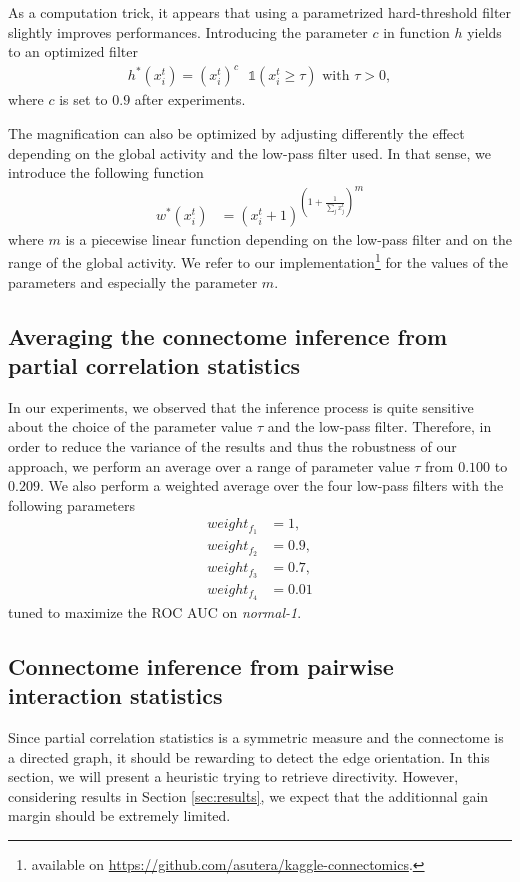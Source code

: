 \documentclass[wcp]{jmlr}
\begin{document}
As a computation trick, it appears that using a parametrized hard-threshold filter slightly improves performances. Introducing the parameter $c$ in function $h$ yields to an optimized filter \begin{align}
h^*(x^t_i) = (x_i^t)^c \text{ } \mathbb{1}(x_i^t \ge \tau) \text{ with } \tau > 0,
\end{align}
where $c$ is set to $0.9$ after experiments.

The magnification can also be optimized by adjusting differently the effect depending on the global activity and the low-pass filter used. In that sense, we introduce the following function \begin{align}
 w^*(x^{t}_i) &= {(x^{t}_i + 1 )^{\left (1 + \frac{1}{\sum_{j} x^{t}_j}\right )}}^{m}
\end{align}
where $m$ is a piecewise linear function depending on the low-pass filter and on the range of the global activity. We refer to our implementation\footnote{available on \url{https://github.com/asutera/kaggle-connectomics}.} for the values of the parameters and especially the parameter $m$.

\subsection*{Averaging the connectome inference from partial correlation statistics}

In our experiments, we observed that the inference process is quite sensitive
about the choice of the parameter value $\tau$ and the low-pass filter.
Therefore, in order to reduce the variance of the results and thus the
robustness of our approach, we perform an average over a range of parameter
value $\tau$ from $0.100$ to $0.209$. We also perform a weighted average over
the four low-pass filters with the following parameters
\begin{align*}
weight_{f_1} &= 1,\\
weight_{f_2} &= 0.9, \\
weight_{f_3} &= 0.7, \\
weight_{f_4} &= 0.01
\end{align*}
tuned to maximize the
ROC AUC on \textit{normal-1}.

\subsection*{Connectome inference from pairwise interaction statistics}

Since partial correlation statistics is a symmetric measure and the connectome
is a directed graph, it should be rewarding to detect the edge orientation. In
this section, we will present a heuristic trying to retrieve directivity.
However, considering results in Section \ref{sec:results}, we expect that the
additionnal gain margin should be extremely limited.
\end{document}
